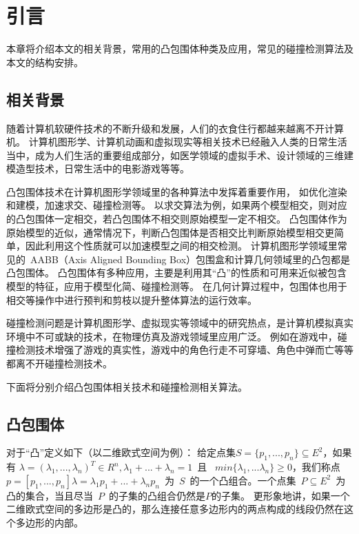 

\chapter{引言}
\label{cha:intro}

本章将介绍本文的相关背景，常用的凸包围体种类及应用，常见的碰撞检测算法及本文的结构安排。


\section{相关背景}

随着计算机软硬件技术的不断升级和发展，人们的衣食住行都越来越离不开计算机。
计算机图形学、计算机动画和虚拟现实等相关技术已经融入人类的日常生活当中，成为人们生活的重要组成部分，如医学领域的虚拟手术、设计领域的三维建模造型技术，日常生活中的电影游戏等等。

凸包围体技术在计算机图形学领域里的各种算法中发挥着重要作用，
如优化渲染和建模，加速求交、碰撞检测等。
以求交算法为例，如果两个模型相交，则对应的凸包围体一定相交，若凸包围体不相交则原始模型一定不相交。
凸包围体作为原始模型的近似，通常情况下，判断凸包围体是否相交比判断原始模型相交更简单，因此利用这个性质就可以加速模型之间的相交检测。
计算机图形学领域里常见的~AABB（Axis Aligned Bounding Box）包围盒和计算几何领域里的凸包都是凸包围体。
凸包围体有多种应用，主要是利用其“凸”的性质和可用来近似被包含模型的特征，应用于模型化简、碰撞检测等。
在几何计算过程中，包围体也用于相交等操作中进行预判和剪枝以提升整体算法的运行效率。

碰撞检测问题是计算机图形学、虚拟现实等领域中的研究热点，是计算机模拟真实环境中不可或缺的技术，在物理仿真及游戏领域里应用广泛。
例如在游戏中，碰撞检测技术增强了游戏的真实性，游戏中的角色行走不可穿墙、角色中弹而亡等等都离不开碰撞检测技术。

下面将分别介绍凸包围体相关技术和碰撞检测相关算法。

\section{凸包围体}
\label{sec:convex-bv}

对于“凸”定义如下（以二维欧式空间为例）：
给定点集$S = \{p_1, ..., p_n\} \subseteq E^2$，如果有
$\lambda = (\lambda_1,...,\lambda_n)^T \in R^n, \lambda_1 + ... + \lambda_n = 1
$~且~ $min\{\lambda_1,...\lambda_n\} \geq 0$，我们称点 $p = [p_1, ... ,
p_n]\lambda = \lambda_1 p_1 + ... + \lambda_n
p_n$~为~$S$~的一个凸组合。一个点集~$P \subseteq E^2$~为凸的集合，当且尽当~$P$~的子集的凸组合仍然是$P$的子集。
更形象地讲，如果一个二维欧式空间的多边形是凸的，那么连接任意多边形内的两点构成的线段仍然在这个多边形的内部。

